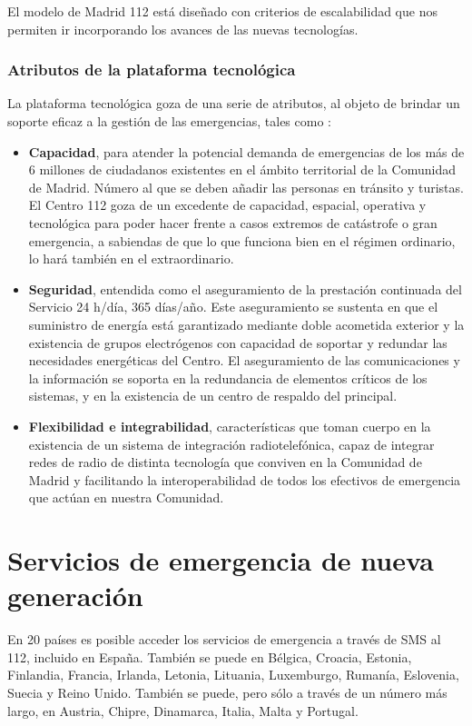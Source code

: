 El modelo de Madrid 112 está diseñado con criterios de escalabilidad que nos permiten ir incorporando los avances de las nuevas tecnologías.

\subsubsection{Atributos de la plataforma tecnológica}

La plataforma tecnológica goza de una serie de atributos, al objeto de brindar un soporte eficaz a la gestión de las emergencias, tales como \cite{madrid3}:

\begin{itemize}
  \item \textbf{Capacidad}, para atender la potencial demanda de emergencias de los más de 6 millones de ciudadanos existentes en el ámbito territorial de la Comunidad de Madrid. Número al que se deben añadir las personas en tránsito y turistas. El Centro 112 goza de un excedente de capacidad, espacial, operativa y tecnológica para poder hacer frente a casos extremos de catástrofe o gran emergencia, a sabiendas de que lo que funciona bien en el régimen ordinario, lo hará también en el extraordinario.
  \item \textbf{Seguridad}, entendida como el aseguramiento de la prestación continuada del Servicio 24 h/día, 365 días/año. Este aseguramiento se sustenta en que el suministro de energía está garantizado mediante doble acometida exterior y la existencia de grupos electrógenos con capacidad de soportar y redundar las necesidades energéticas del Centro. El aseguramiento de las comunicaciones y la información se soporta en la redundancia de elementos críticos de los sistemas, y en la existencia de un centro de respaldo del principal.
  \item \textbf{Flexibilidad e integrabilidad}, características que toman cuerpo en la existencia de un sistema de integración radiotelefónica, capaz de integrar redes de radio de distinta tecnología que conviven en la Comunidad de Madrid y facilitando la interoperabilidad de todos los efectivos de emergencia que actúan en nuestra Comunidad.
\end{itemize}

\section{Servicios de emergencia de nueva generación}

En 20 países es posible acceder los servicios de emergencia a través de SMS al 112, incluido en España. También se puede en Bélgica, Croacia, Estonia, Finlandia, Francia, Irlanda, Letonia, Lituania, Luxemburgo, Rumanía, Eslovenia, Suecia y Reino Unido. También se puede, pero sólo a través de un número más largo, en Austria, Chipre, Dinamarca, Italia, Malta y Portugal.

